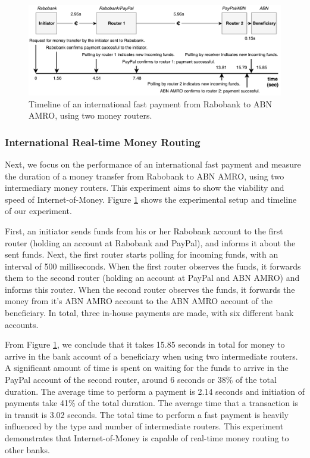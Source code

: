 \begin{figure}[t]
	\centering
	\includegraphics[width=\linewidth]{iom/assets/speedball}
	\caption{Timeline of an international fast payment from Rabobank to ABN AMRO, using two money routers.}
	\label{fig:speedball_experiment}
\end{figure}

\subsubsection*{International Real-time Money Routing}
Next, we focus on the performance of an international fast payment and measure the duration of a money transfer from Rabobank to ABN AMRO, using two intermediary money routers.
This experiment aims to show the viability and speed of Internet-of-Money.
Figure \ref{fig:speedball_experiment} shows the experimental setup and timeline of our experiment.

First, an initiator sends funds from his or her Rabobank account to the first router (holding an account at Rabobank and PayPal), and informs it about the sent funds.
Next, the first router starts polling for incoming funds, with an interval of 500 milliseconds.
When the first router observes the funds, it forwards them to the second router (holding an account at PayPal and ABN AMRO) and informs this router.
When the second router observes the funds, it forwards the money from it's ABN AMRO account to the ABN AMRO account of the beneficiary.
In total, three in-house payments are made, with six different bank accounts.

From Figure \ref{fig:speedball_experiment}, we conclude that it takes 15.85 seconds in total for money to arrive in the bank account of a beneficiary when using two intermediate routers.
A significant amount of time is spent on waiting for the funds to arrive in the PayPal account of the second router, around 6 seconds or 38\% of the total duration.
The average time to perform a payment is 2.14 seconds and initiation of payments take 41\% of the total duration.
The average time that a transaction is in transit is 3.02 seconds.
The total time to perform a fast payment is heavily influenced by the type and number of intermediate routers.
This experiment demonstrates that Internet-of-Money is capable of real-time money routing to other banks.

